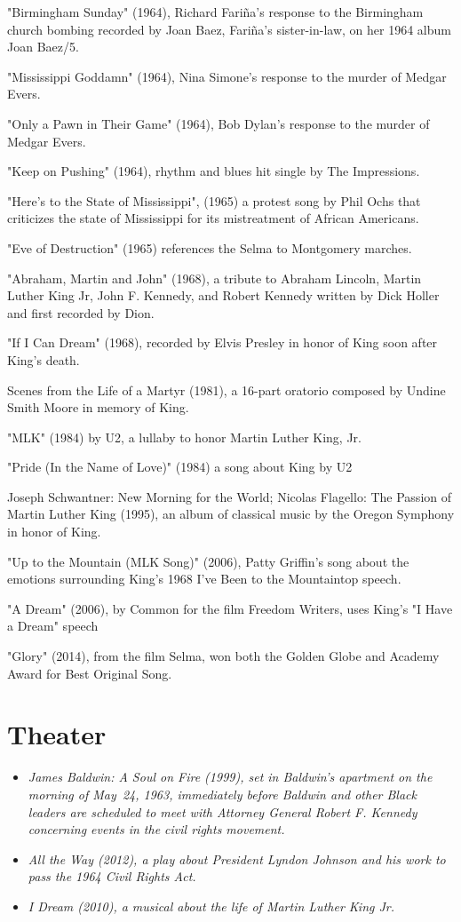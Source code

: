 "Birmingham Sunday" (1964), Richard Fariña's response to the Birmingham
church bombing recorded by Joan Baez, Fariña's sister-in-law, on her
1964 album Joan Baez/5.

"Mississippi Goddamn" (1964), Nina Simone's response to the murder of
Medgar Evers.

"Only a Pawn in Their Game" (1964), Bob Dylan's response to the murder
of Medgar Evers.

"Keep on Pushing" (1964), rhythm and blues hit single by The
Impressions.

"Here's to the State of Mississippi", (1965) a protest song by Phil Ochs
that criticizes the state of Mississippi for its mistreatment of African
Americans.

"Eve of Destruction" (1965) references the Selma to Montgomery marches.

"Abraham, Martin and John" (1968), a tribute to Abraham Lincoln, Martin
Luther King Jr, John F. Kennedy, and Robert Kennedy written by Dick
Holler and first recorded by Dion.

"If I Can Dream" (1968), recorded by Elvis Presley in honor of King soon
after King's death.

Scenes from the Life of a Martyr (1981), a 16-part oratorio composed by
Undine Smith Moore in memory of King.

"MLK" (1984) by U2, a lullaby to honor Martin Luther King, Jr.

"Pride (In the Name of Love)" (1984) a song about King by U2

Joseph Schwantner: New Morning for the World; Nicolas Flagello: The
Passion of Martin Luther King (1995), an album of classical music by the
Oregon Symphony in honor of King.

"Up to the Mountain (MLK Song)" (2006), Patty Griffin's song about the
emotions surrounding King's 1968 I've Been to the Mountaintop speech.

"A Dream" (2006), by Common for the film Freedom Writers, uses King's "I
Have a Dream" speech

"Glory" (2014), from the film Selma, won both the Golden Globe and
Academy Award for Best Original Song.

\section{Theater}\label{theater}

\begin{itemize}
\item
  \emph{James Baldwin: A Soul on Fire (1999), set in Baldwin's apartment
  on the morning of May~24, 1963, immediately before Baldwin and other
  Black leaders are scheduled to meet with Attorney General Robert F.
  Kennedy concerning events in the civil rights movement.}
\item
  \emph{All the Way (2012), a play about President Lyndon Johnson and
  his work to pass the 1964 Civil Rights Act.}
\item
  \emph{I Dream (2010), a musical about the life of Martin Luther King
  Jr.}
\end{itemize}

